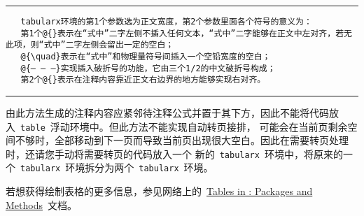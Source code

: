 \noindent\hrule

\begin{verbatim}
   tabularx环境的第1个参数选为正文宽度，第2个参数里面各个符号的意义为：
   第1个@{}表示在“式中”二字左侧不插入任何文本，“式中”二字能够在正文中左对齐，若无此项，则“式中”二字左侧会留出一定的空白；
   @{\quad}表示在“式中”和物理量符号间插入一个空铅宽度的空白；
   @{— — —}实现插入破折号的功能，它由三个1/2的中文破折号构成；
   第2个@{}表示在注释内容靠近正文右边界的地方能够实现右对齐。
\end{verbatim}

\noindent\hrule\vspace{1em}

由此方法生成的注释内容应紧邻待注释公式并置于其下方，因此不能将代码放入~\verb|table|~浮动环境中。但此方法不能实现自动转页接排，
可能会在当前页剩余空间不够时，全部移动到下一页而导致当前页出现很大空白。因此在需要转页处理时，还请您手动将需要转页的代码放入一个
新的~\verb|tabularx|~环境中，将原来的一个~\verb|tabularx|~环境拆分为两个~\verb|tabularx|~环境。

若想获得绘制表格的更多信息，参见网络上的~\href{http://www.tug.org/pracjourn/2007-1/mori/}{Tables in \LaTeXe: Packages and Methods}~文档。

